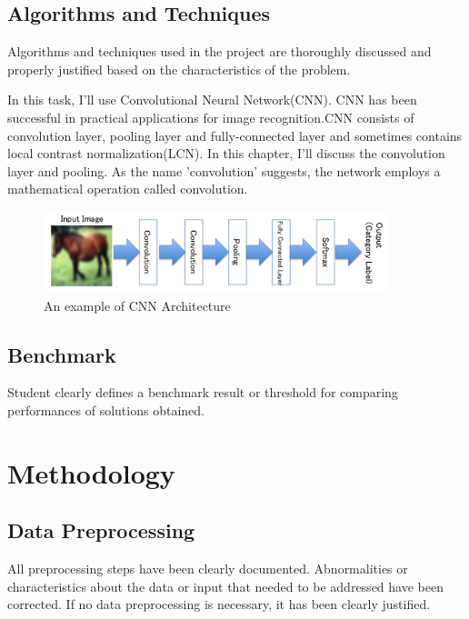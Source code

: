 \documentclass[a4paper,10pt,fleqn]{article}
\begin{document}
\subsection{Algorithms and Techniques}
Algorithms and techniques used in the project are thoroughly discussed and properly justified based on the characteristics of the problem.

In this task, I'll use Convolutional Neural Network(CNN). CNN has been successful in  practical applications for image recognition.CNN consists of convolution layer, pooling layer and fully-connected layer and sometimes contains local contrast normalization(LCN). In this chapter, I'll discuss the convolution layer and pooling.
As the name 'convolution' suggests, the network employs a mathematical operation called convolution. 

\begin{figure}[htbp]

	\begin{center}
	\includegraphics[width=10cm]{picture/Architecture_of_CNN.png}
	\caption{An example of CNN Architecture}
	\end{center}
	
	\label{fig:four}

\end{figure}



\subsection{Benchmark}
Student clearly defines a benchmark result or threshold for comparing performances of solutions obtained.


\section{Methodology}
\subsection{Data Preprocessing}
All preprocessing steps have been clearly documented. Abnormalities or characteristics about the data or input that needed to be addressed have been corrected. If no data preprocessing is necessary, it has been clearly justified.
\end{document}
